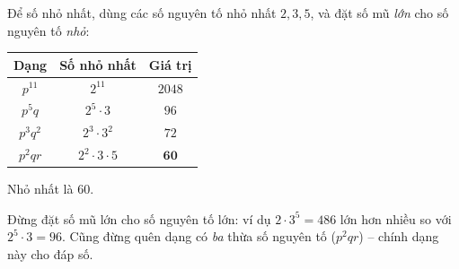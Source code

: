 {
Để số nhỏ nhất, dùng các số nguyên tố nhỏ nhất $2,3,5$, và đặt số mũ \emph{lớn} cho số nguyên tố \emph{nhỏ}:
\begin{center}
\begin{tabular}{|c|c|c|}
\hline
\rowcolor{Tint}Dạng & Số nhỏ nhất & Giá trị\\
\hline
$p^{11}$ & $2^{11}$ & $2048$\\
$p^{5}q$ & $2^5\cdot 3$ & $96$\\
$p^{3}q^{2}$ & $2^3\cdot 3^2$ & $72$\\
$p^{2}qr$ & $2^2\cdot 3\cdot 5$ & $\mathbf{60}$\\
\hline
\end{tabular}
\end{center}
Nhỏ nhất là $60$.

\begin{warnbox}Đừng đặt số mũ lớn cho số nguyên tố lớn: ví dụ $2\cdot 3^5=486$ lớn hơn nhiều so với $2^5\cdot 3=96$. Cũng đừng quên dạng có \emph{ba} thừa số nguyên tố ($p^2qr$) -- chính dạng này cho đáp số.\end{warnbox}

}

